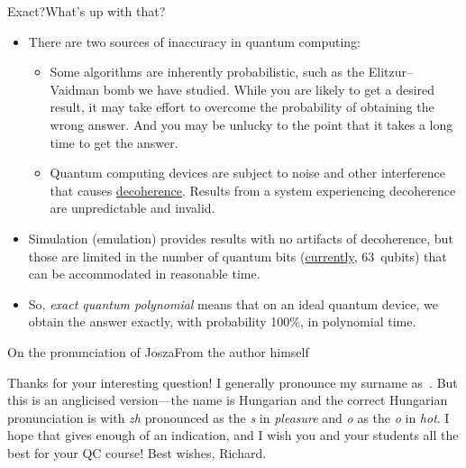 \begin{frame}{Exact?}{What's up with that?}
\begin{itemize}[<+->]
    \item There are two sources of inaccuracy in quantum computing:
    \begin{itemize}
        \item Some algorithms are inherently probabilistic, such as the Elitzur--Vaidman bomb we have studied. While you are likely to get a desired result, it may take effort to overcome the probability of obtaining the wrong answer.  And you may be unlucky to the point that it takes a long time to get the answer.
        \item Quantum computing devices are subject to noise and other interference that causes \href{https://en.wikipedia.org/wiki/Quantum_decoherence}{decoherence}.  Results from a system experiencing decoherence are unpredictable and invalid.
    \end{itemize}
    \item Simulation (emulation) provides results with no artifacts of decoherence, but those are limited in the number of quantum bits (\href{https://qiskit.org/documentation/tutorials/simulators/6_extended_stabilizer_tutorial.html}{currently}, 63~qubits) that can be accommodated in reasonable time.
    \item So, \emph{exact quantum polynomial} means that on an ideal quantum device, we obtain the answer exactly, with probability 100\%, in polynomial time.
\end{itemize}
\end{frame}

\begin{frame}{On the pronunciation of Josza}{From the author himself}

Thanks for your interesting question!  I generally pronounce my surname as~.
\SmallSkip{}
But this is an anglicised version---the name is Hungarian and the correct Hungarian pronunciation is   with \emph{zh} pronounced as the \emph{s} in \emph{pleasure} and \emph{o} as the \emph{o} in \emph{hot}.
\SmallSkip{}
I hope that gives enough of an indication, and I wish you and your students all the best for your QC course!
\BigSkip{}
Best wishes,  Richard.
\end{frame}

